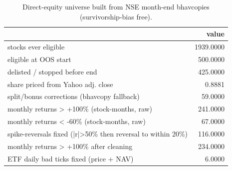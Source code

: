 \begin{table}
\caption{Direct-equity universe built from NSE month-end bhavcopies (survivorship-bias free).}
\label{tab:T04_stock_universe}
\begin{tabular}{lr}
\toprule
 & value \\
\midrule
stocks ever eligible & 1939.0000 \\
eligible at OOS start & 500.0000 \\
delisted / stopped before end & 425.0000 \\
share priced from Yahoo adj. close & 0.8881 \\
split/bonus corrections (bhavcopy fallback) & 59.0000 \\
monthly returns > +100\% (stock-months, raw) & 241.0000 \\
monthly returns < -60\% (stock-months, raw) & 67.0000 \\
spike-reversals fixed (|r|>50\% then reversal to within 20\%) & 116.0000 \\
monthly returns > +100\% after cleaning & 234.0000 \\
ETF daily bad ticks fixed (price + NAV) & 6.0000 \\
\bottomrule
\end{tabular}
\end{table}
